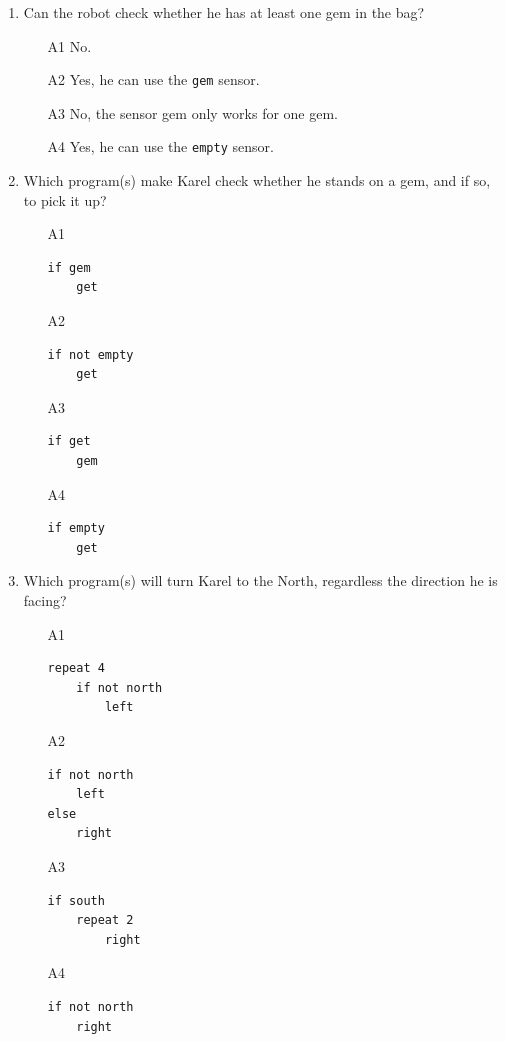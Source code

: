 {{{{\begin{enumerate}
\begin{enumerate}
\item[A1] Yes but his home must be in front of him.
\item[A2] Yes, there is the sensor {\tt home} for that.
\item[A3] No.
\item[A4] Yes but not when he is at home.
\end{enumerate}
\item Can the robot check whether he has at least one gem in the bag?
\begin{enumerate}
\item[A1] No.
\item[A2] Yes, he can use the {\tt gem} sensor. 
\item[A3] No, the sensor gem only works for one gem.
\item[A4] Yes, he can use the {\tt empty} sensor.
\end{enumerate}
\item Which program(s) make Karel check whether he stands on a gem, and if so, to pick it up?
\begin{enumerate}
\item[A1] 
\begin{verbatim}
if gem
    get
\end{verbatim}
\item[A2] 
\begin{verbatim}
if not empty
    get
\end{verbatim}
\item[A3] 
\begin{verbatim}
if get
    gem
\end{verbatim}
\item[A4] 
\begin{verbatim}
if empty
    get
\end{verbatim}
\end{enumerate}
\item Which program(s) will turn Karel to the North, regardless the direction he is facing?
\begin{enumerate}
\item[A1] 
\begin{verbatim}
repeat 4
    if not north 
        left
\end{verbatim}
\item[A2] 
\begin{verbatim}
if not north 
    left
else 
    right
\end{verbatim}
\item[A3] 
\begin{verbatim}
if south
    repeat 2
        right
\end{verbatim}
\item[A4] 
\begin{verbatim}
if not north 
    right
\end{verbatim}
\end{enumerate}


\end{enumerate}}}}}
